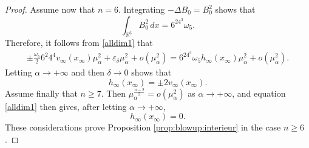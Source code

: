 \documentclass[10pt]{amsart}
\numberwithin{equation}{section}
\newcommand{\ve}{\varepsilon}
\newcommand{\ma}{\mu_\alpha}
\def \rr {\mathbb{R}}
\def \ma{\mu_{\alpha}}
\def \hi{h_{\infty}}
\def \vo {v_{\infty}}
\def \xin{x_{\infty}}
\theoremstyle{plain}
\theoremstyle{remark}
\begin{document}
\begin{proof}
Assume now that $n=6$. Integrating $-\Delta B_0 = B_0^2$ shows that 
\begin{equation*} 
	\int_{\rr^6} B_0^2\, dx=6^24^3 \omega_5.
\end{equation*}
Therefore,  it follows from \eqref{alldim1} that 
\begin{eqnarray*}
\pm \frac{\omega_{5}}{2}6^{2}4^4\vo(\xin)\ma^{2}+\ve_\delta \ma^2 + o(\ma^{2})=6^24^3\omega_5\hi(\xin)\ma^{2}+o(\ma^{2}).
\end{eqnarray*}
Letting $\alpha \to +\infty$ and then $\delta \to 0$ shows that 
\begin{equation*} 
	\hi(\xin)= \pm2\vo(\xin).
\end{equation*}
Assume finally that $n \ge 7$. Then $\ma^{\frac{n-2}{2}}= o(\ma^2)$ as $\alpha \to + \infty$, and equation \eqref{alldim1} then gives, after letting $\alpha \to + \infty$,
$$ h_\infty(x_\infty) = 0. $$
These considerations prove Proposition \ref{prop:blowup:interieur} in the case $n \ge 6$. 

\medskip


\end{proof}
\end{document}
